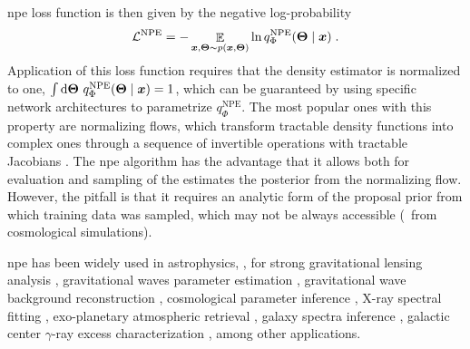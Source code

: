 \Gls*{npe} loss function is then given by the negative log-probability
%
\begin{equation} \label{eq:lnpe}
	\mathcal{L}^\text{NPE}=-\mathop{\mathbb{E}}\limits_{\bm{x}, \bm{\Theta} \sim p(\bm{x}, \bm{\Theta})} \ln q^\text{NPE}_\Phi(\bm{\Theta} \mid \bm{x}) \;.
\end{equation}
%
Application of this loss function requires that the density estimator is normalized to one, $\int \dd\bm{\Theta}\ q^\text{NPE}_\Phi(\bm{\Theta} \mid \bm{x})=1$, which can be guaranteed by using specific network architectures to parametrize $q^\text{NPE}_\Phi$. The most popular ones with this property are normalizing flows, which transform tractable density functions into complex ones through a sequence of invertible operations with tractable Jacobians \cite{kobyzev2020normalizing, papamakarios2021normalizing}. The \gls*{npe} algorithm has the advantage that it allows both for evaluation and sampling of the estimates the posterior from the normalizing flow. However, the pitfall is that it requires an analytic form of the proposal prior from which training data was sampled, which may not be always accessible (\eg\ from cosmological simulations).

\Gls*{npe} has been widely used in astrophysics, \eg, for strong gravitational lensing analysis \cite{Wagner-Carena:2020yun, Wagner-Carena:2022mrn, wagnercarena2024strong}, gravitational waves parameter estimation \cite{Dax:2021tsq, Crisostomi:2023tle, kolmus2024tuning}, gravitational wave background reconstruction \cite{Dimitriou:2023knw}, cosmological parameter inference \cite{Tucci:2023bag}, X-ray spectral fitting \cite{Barret:2024kvc}, exo-planetary atmospheric retrieval \cite{vasist2023neural}, galaxy spectra inference \cite{Hahn:2022nda, khullar2022digs}, galactic center $\gamma$-ray excess characterization \cite{Mishra-Sharma:2021oxe}, among other applications.

